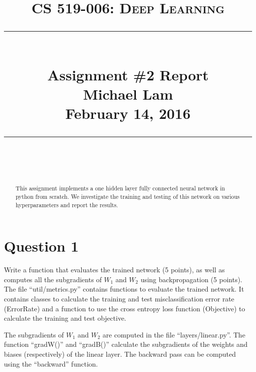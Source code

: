 \documentclass[paper=a4, fontsize=11pt]{scrartcl}
\newcommand{\lecture}{Assignment \#2 Report} %
\newcommand{\lecturedate}{February 14, 2016} %
\newcommand{\scribe}{Michael Lam} %
\begin{document}
\newcommand{\horrule}[1]{\rule{\linewidth}{#1}} %

\title{	
\normalfont \normalsize
\vspace{-30pt}
\textsc{CS 519-006: Deep Learning} \\ [10pt]
\horrule{0.5pt} \\[0.4cm] %
\LARGE \lecture\\ %
\vspace{5pt}
\normalsize \scribe\\
\lecturedate\\
\horrule{2pt} \\[0.5cm] %
}


\date{} %

\maketitle
\vspace{-100pt}

\begin{abstract}
This assignment implements a one hidden layer fully connected neural network in python from scratch.  We investigate the training and testing of this network on various hyperparameters and report the results.
\end{abstract}

\section{Question 1}

{\small Write a function that evaluates the trained network (5 points), as well as computes all the subgradients of $W_1$ and $W_2$ using backpropagation (5 points).}\\

The file ``util/metrics.py'' contains functions to evaluate the trained network. It contains classes to calculate the training and test misclassification error rate (ErrorRate) and a function to use the cross entropy loss function (Objective) to calculate the training and test objective.

The subgradients of $W_1$ and $W_2$ are computed in the file ``layers/linear.py''.  The function ``gradW()'' and ``gradB()'' calculate the subgradients of the weights and biases (respectively) of the linear layer.  The backward pass can be computed using the ``backward'' function.
\end{document}

